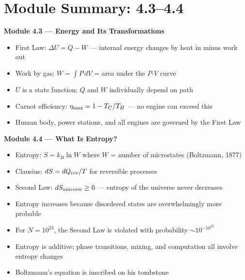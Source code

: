 \documentclass[12pt, a4paper, twoside]{book}
\begin{document}
\chapter*{Module Summary: 4.3--4.4}

\begin{tcolorbox}[enhanced,colback=deep!4,colframe=deep,
  title={\bfseries\color{white} Key Ideas: Modules 4.3--4.4},
  attach boxed title to top left={yshift=-2mm,xshift=4mm},
  boxed title style={colback=deep}]
\textbf{Module 4.3 --- Energy and Its Transformations}
\begin{itemize}[leftmargin=1.5em,itemsep=2pt]
  \item First Law: $\Delta U = Q - W$ --- internal energy changes by heat in minus work out
  \item Work by gas: $W = \int P\,dV$ = area under the $P$-$V$ curve
  \item $U$ is a state function; $Q$ and $W$ individually depend on path
  \item Carnot efficiency: $\eta_{\rm max} = 1 - T_C/T_H$ --- no engine can exceed this
  \item Human body, power stations, and all engines are governed by the First Law
\end{itemize}
\vspace{6pt}
\textbf{Module 4.4 --- What Is Entropy?}
\begin{itemize}[leftmargin=1.5em,itemsep=2pt]
  \item Entropy: $S = k_B\ln W$ where $W$ = number of microstates (Boltzmann, 1877)
  \item Clausius: $dS = dQ_{\rm rev}/T$ for reversible processes
  \item Second Law: $dS_{\rm universe} \geq 0$ --- entropy of the universe never decreases
  \item Entropy increases because disordered states are overwhelmingly more probable
  \item For $N = 10^{23}$, the Second Law is violated with probability $\sim 10^{-10^{22}}$
  \item Entropy is additive; phase transitions, mixing, and computation all involve entropy changes
  \item Boltzmann's equation is inscribed on his tombstone
\end{itemize}
\end{tcolorbox}

\vspace{0.5cm}
\begin{center}
\end{center}
\end{document}
